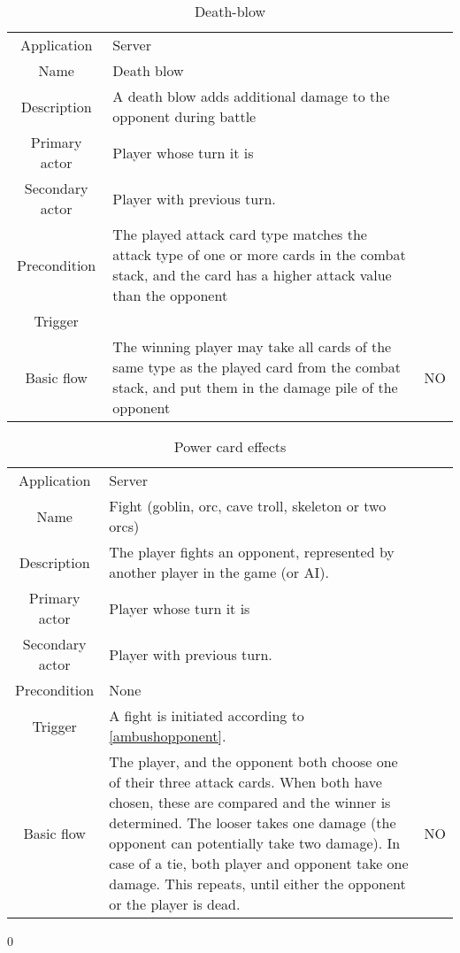 \documentclass[a4paper,10pt]{report}
\begin{document}
\begin{table}
\caption{Death-blow}
\label{fight_deathblow}
\begin{tabular}{|c| p{9cm}|c}
\hline
Application & Server & \\
Name & Death blow & \\
Description & A death blow adds additional damage to the opponent during battle & \\
Primary actor & Player whose turn it is & \\
Secondary actor & Player with previous turn. & \\
Precondition & The played attack card type matches the attack type of one or more cards in the combat stack, and the card has a higher attack value than the opponent & \\
Trigger &  & \\ \hline
Basic flow & The winning player may take all cards of the same type as the played card from the combat stack, and put them in the damage pile of the opponent & NO\\
\hline
\end{tabular}
\end{table}



\begin{table}
\caption{Power card effects}
\label{fight_powercard}
\begin{tabular}{|c| p{9cm}|c}
\hline
Application & Server & \\
Name & Fight (goblin, orc, cave troll, skeleton or two orcs) & \\
Description & The player fights an opponent, represented by another player in the game (or AI). & \\
Primary actor & Player whose turn it is & \\
Secondary actor & Player with previous turn. & \\
Precondition & None & \\
Trigger & A fight is initiated according to \ref{ambushopponent}. & \\ \hline
Basic flow & The player, and the opponent both choose one of their three attack cards. When both have chosen, these are compared and the winner is determined. The looser takes one damage (the opponent can potentially take two damage). In case of a tie, both player and opponent take one damage. This repeats, until either the opponent or the player is dead. & NO\\ \hline
\hline
\end{tabular}
\end{table}
0
\end{document}
